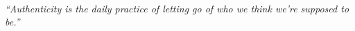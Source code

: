 \documentclass[preview]{standalone}
\begin{document}
\begin{center}
\quad\\\textit{“Authenticity is the daily practice of letting go of who we think we’re supposed to be.”}
\end{center}
\end{document}
